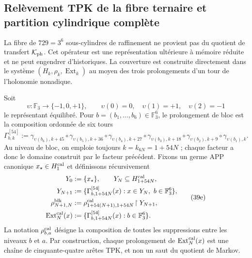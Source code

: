 \subsection{Relèvement TPK de la fibre ternaire et partition cylindrique complète}
\label{subsec:elevacion-catalogal-ch}

La fibre de \(729=3^6\) sous-cylindres de raffinement ne provient pas du quotient de transfert \(\mathcal K_{\rm ph}\). Cet opérateur est une représentation ultérieure à mémoire réduite et ne peut engendrer d'historiques. La couverture est construite directement dans le système \((H_k,\rho_k,\operatorname{Ext}_k)\) au moyen des trois prolongements d'un tour de l'holonomie nonadique.





Soit
\[
 \upsilon:\mathbb F_3\longrightarrow\{-1,0,+1\},\qquad
 \upsilon(0)=0,\quad\upsilon(1)=+1,\quad\upsilon(2)=-1
\]
le représentant équilibré. Pour \(b=(b_1,\ldots,b_6)\in\mathbb F_3^6\), le prolongement de bloc est la composition ordonnée de six tours
\[
 \Gamma_{b,k}^{[54]}:=
 \gamma_{\upsilon(b_6),k+45}\circ\gamma_{\upsilon(b_5),k+36}\circ
 \gamma_{\upsilon(b_4),k+27}\circ\gamma_{\upsilon(b_3),k+18}\circ
 \gamma_{\upsilon(b_2),k+9}\circ\gamma_{\upsilon(b_1),k}.
\tag{39d}
\label{eq:gamma-bloque-54-ch}
\]
Au niveau de bloc, on emploie toujours \(k=k_{6N}=1+54N\) ; chaque facteur a donc le domaine construit par le facteur précédent. Fixons un germe APP canonique \(x_\star\in H^{\rm cal}_1\) et définissons récursivement
\[
 \begin{aligned}
  Y_0&:=\{x_\star\},\qquad Y_N\subseteq H_{1+54N}^{\rm cal},\\
  Y_{N+1}&:=\{\Gamma_{b,1+54N}^{[54]}(x):
                 x\in Y_N,\ b\in\mathbb F_3^6\},\\
  \rho^{\rm blk}_{N+1,N}
    &:=\rho^{\rm cal}_{1+54(N+1),1+54N}
       \!\upharpoonright Y_{N+1},\\
  \operatorname{Ext}^{\rm cal}_N(x)
    &:=\{\Gamma_{b,1+54N}^{[54]}(x):b\in\mathbb F_3^6\}.
 \end{aligned}
\tag{39e}
\label{eq:sincronizacion-54-ch}
\]
La notation \(\rho^{\rm cal}_{b,a}\) désigne la composition de toutes les suppressions
entre les niveaux \(b\) et \(a\). Par construction, chaque prolongement de
\(\operatorname{Ext}^{\rm cal}_N(x)\) est une chaîne de cinquante-quatre
arêtes TPK, et non un saut du quotient de Markov.

